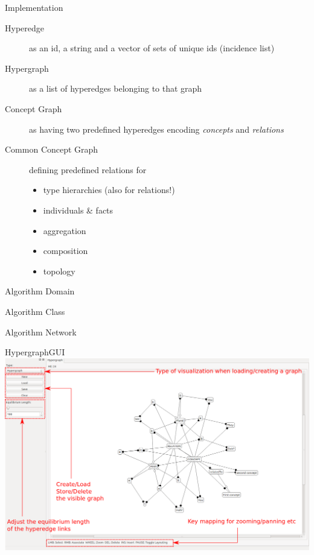 \documentclass[pdf]
{beamer}
\begin{document}
\begin{frame}{Implementation}
    \begin{description}
    \item[Hyperedge] as an id, a string and a vector of sets of unique ids (incidence list)
    \item[Hypergraph] as a list of hyperedges belonging to that graph
    \item[Concept Graph] as having two predefined hyperedges encoding \emph{concepts} and \emph{relations}
    \item[Common Concept Graph] defining predefined relations for
        \begin{itemize}
        \item type hierarchies (also for relations!) %
        \item individuals \& facts %
        \item aggregation %
        \item composition %
        \item topology %
        \end{itemize}
    \end{description}
\end{frame}

\begin{frame}{Algorithm Domain}
	\centering
	
\end{frame}

\begin{frame}{Algorithm Class}
	\centering
	
\end{frame}

\begin{frame}{Algorithm Network}
	\centering
	
\end{frame}


\begin{frame}{HypergraphGUI}
    \centering
    \includegraphics[width=\textwidth]{pics/HypergraphGUI.png}
\end{frame}
\end{document}
